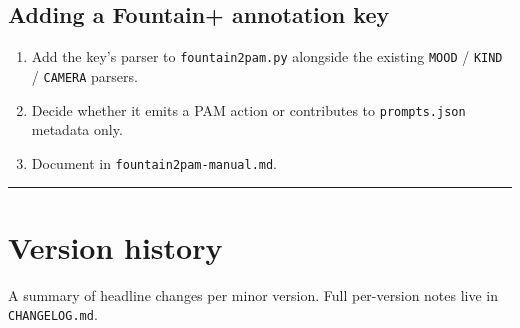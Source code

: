 \documentclass[
  11pt,
]{book}
\providecommand{\tightlist}{%
  \setlength{\itemsep}{0pt}\setlength{\parskip}{0pt}}
\begin{document}
\subsection{Adding a Fountain+ annotation
key}\label{adding-a-fountain-annotation-key}

\begin{enumerate}
\def\labelenumi{\arabic{enumi}.}
\tightlist
\item
  Add the key's parser to \texttt{fountain2pam.py} alongside the
  existing \texttt{MOOD} / \texttt{KIND} / \texttt{CAMERA} parsers.
\item
  Decide whether it emits a PAM action or contributes to
  \texttt{prompts.json} metadata only.
\item
  Document in \texttt{fountain2pam-manual.md}.
\end{enumerate}

\begin{center}\rule{0.5\linewidth}{0.5pt}\end{center}

\section{Version history}\label{version-history}

A summary of headline changes per minor version. Full per-version notes
live in \texttt{CHANGELOG.md}.
\end{document}
